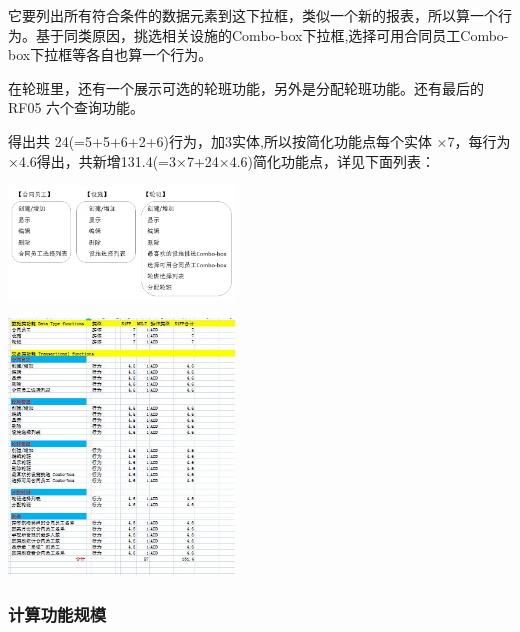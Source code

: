 它要列出所有符合条件的数据元素到这下拉框，类似一个新的报表，所以算一个行为。基于同类原因，挑选相关设施的Combo-box下拉框,选择可用合同员工Combo-box下拉框等各自也算一个行为。

在轮班里，还有一个展示可选的轮班功能，另外是分配轮班功能。还有最后的
RF05 六个查询功能。

得出共 24(=5+5+6+2+6)行为，加3实体,所以按简化功能点每个实体 ×7，每行为
×4.6得出，共新增131.4(=3×7+24×4.6)简化功能点，详见下面列表：


\includegraphics[width=6cm]{Ex1SoluScreenshot_2022-04-05_115926-1.jpg}


\includegraphics[width=6cm]{微信截图_20220412130822.jpg}

\hypertarget{ux8ba1ux7b97ux529fux80fdux89c4ux6a21}{%
\subsubsection{计算功能规模}\label{ux8ba1ux7b97ux529fux80fdux89c4ux6a21}}

\begin{description}
\item[]
\end{description}

